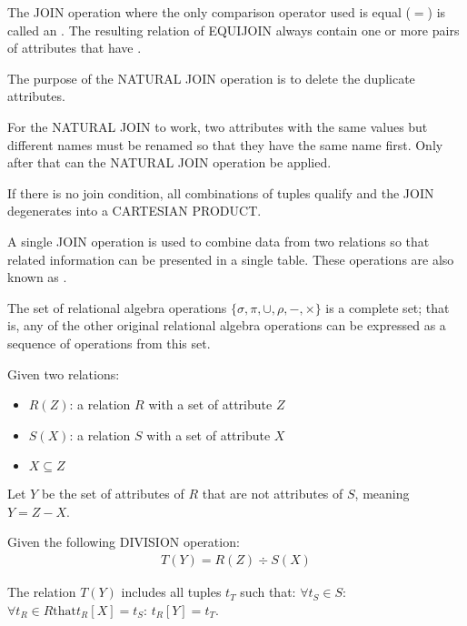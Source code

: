      \par The JOIN operation where the only comparison operator used is equal ($=$) is called an . The resulting relation of EQUIJOIN always contain one or more pairs of attributes that have .
      \par The purpose of the NATURAL JOIN operation is to delete the duplicate attributes.
      \par For the NATURAL JOIN to work, two attributes with the same values but different names must be renamed so that they have the same name first. Only after that can the NATURAL JOIN operation be applied.

    \par If there is no join condition, all combinations of tuples qualify and the JOIN degenerates into a CARTESIAN PRODUCT.
    \par A single JOIN operation is used to combine data from two relations so that related information can be presented in a single table. These operations are also known as .

    \par The set of relational algebra operations $\{\sigma, \pi, \cup, \rho, -, \times\}$ is a complete set; that is, any of the other original relational algebra operations can be expressed as a sequence of operations from this set.

      \par Given two relations:
      \begin{itemize}
        \item $R(Z)$: a relation $R$ with a set of attribute $Z$
        \item $S(X)$: a relation $S$ with a set of attribute $X$
        \item $X \subseteq Z$
      \end{itemize}
      \par Let $Y$ be the set of attributes of $R$ that are not attributes of $S$, meaning
        $Y = Z - X$.
      \par Given the following DIVISION operation:
      \begin{align*}
        T(Y) = R(Z) \div S(X)
      \end{align*}
      \par The relation $T(Y)$ includes all tuples $t_T$ such that: $\forall t_S \in S$:
      $\forall t_R \in R \mbox{that} t_{R}[X] = t_{S}$: $t_{R}[Y] = t_{T}$.

